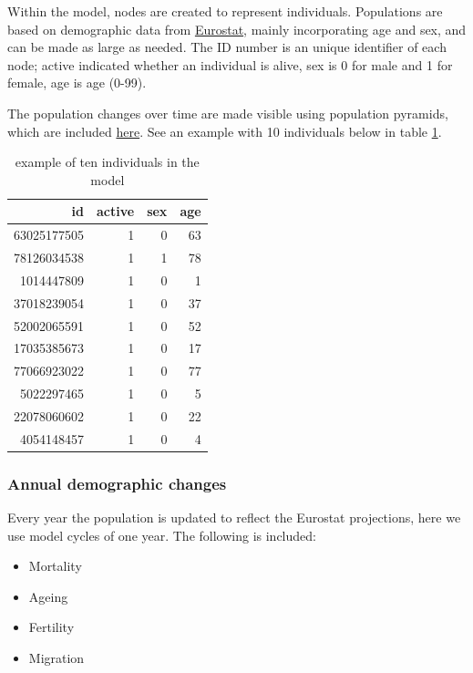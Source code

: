 \documentclass[
]{article}
\begin{document}
Within the model, nodes are created to represent individuals. Populations are based on demographic data from \href{https://ec.europa.eu/eurostat/home}{Eurostat}, mainly incorporating age and sex, and can be made as large as needed. The ID number is an unique identifier of each node; active indicated whether an individual is alive, sex is 0 for male and 1 for female, age is age (0-99).

The population changes over time are made visible using population pyramids, which are included \protect\hyperlink{res_demographics}{here}. See an example with 10 individuals below in table \ref{tab:node-example}.

\begin{table}

\caption{\label{tab:node-example}example of ten individuals in the model}
\centering
\begin{tabular}[t]{r|r|r|r}
\hline
id & active & sex & age\\
\hline
63025177505 & 1 & 0 & 63\\
\hline
78126034538 & 1 & 1 & 78\\
\hline
1014447809 & 1 & 0 & 1\\
\hline
37018239054 & 1 & 0 & 37\\
\hline
52002065591 & 1 & 0 & 52\\
\hline
17035385673 & 1 & 0 & 17\\
\hline
77066923022 & 1 & 0 & 77\\
\hline
5022297465 & 1 & 0 & 5\\
\hline
22078060602 & 1 & 0 & 22\\
\hline
4054148457 & 1 & 0 & 4\\
\hline
\end{tabular}
\end{table}

\hypertarget{annual-demographic-changes}{%
\subsubsection{Annual demographic changes}\label{annual-demographic-changes}}

Every year the population is updated to reflect the Eurostat projections, here we use model cycles of one year. The following is included:

\begin{itemize}
\item
  Mortality
\item
  Ageing
\item
  Fertility
\item
  Migration
\end{itemize}
\end{document}
